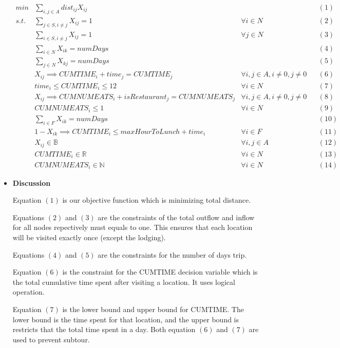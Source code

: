 \documentclass{article}
\begin{document}
\begin{itemize}
		\[
		\begin{aligned}
			min & \sum_{i, j \in A} dist_{ij}X_{ij} & & & (1) \\
			s.t. & \sum_{j \in S, i \ne j} X_{ij} = 1 & \forall i \in N & & (2) \\
			& \sum_{i \in S, i \ne j} X_{ij} = 1 & \forall j \in N & & (3) \\
			& \sum_{i \in N} X_{ik} = numDays & & & (4) \\
			& \sum_{j \in N} X_{kj} = numDays & & & (5) \\
			& X_{ij} \implies CUMTIME_{i} + time_{j} = CUMTIME_{j} & \forall i, j \in A, i \ne 0, j \ne 0 & & (6) \\
			& time_{i} \le CUMTIME_{i} \le 12 & \forall i \in N & & (7) \\
			& X_{ij} \implies CUMNUMEATS_{i} + isRestaurant_{j} = CUMNUMEATS_{j} & \forall i, j \in A, i \ne 0, j \ne 0 & & (8) \\
			& CUMNUMEATS_{i} \le 1 & \forall i \in N & & (9) \\
			& \sum_{i \in F} X_{ik} = numDays & & & (10) \\
			& 1 - X_{ik} \implies CUMTIME_{i} \le maxHourToLunch + time_{i} & \forall i \in F & & (11) \\
			& X_{ij} \in \mathbb{B} & \forall i, j \in A & & (12) \\
			& CUMTIME_{i} \in \mathbb{R} & \forall i \in N& & (13) \\
			& CUMNUMEATS_{i} \in \mathbb{N} & \forall i \in N& & (14)
		\end{aligned}
		\]
		
		\item \textbf{Discussion}
		
		Equation $(1)$ is our objective function which is minimizing total distance.
		
		Equations $(2)$ and $(3)$ are the constraints of the total outflow and inflow for all nodes  repectively must equals to one. This ensures that each location will be visited exactly once (except the lodging).
		
		Equations $(4)$ and $(5)$ are the constraints for the number of days trip.
		
		Equation $(6)$ is the constraint for the CUMTIME decision variable which is the total cumulative time spent after visiting a location. It uses logical operation.
		
		Equation $(7)$ is the lower bound and upper bound for CUMTIME. The lower bound is the time spent for that location, and the upper bound is restricts that the total time spent in a day. Both equation $(6)$ and $(7)$ are used to prevent subtour.
		

\end{itemize}
\end{document}
